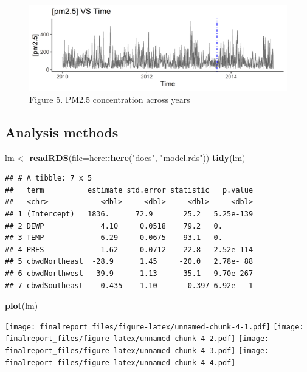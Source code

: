 \documentclass[]{article}
\newenvironment{Shaded}{\begin{snugshade}}{\end{snugshade}}
\newcommand{\DataTypeTok}[1]{\textcolor[rgb]{0.13,0.29,0.53}{#1}}
\newcommand{\KeywordTok}[1]{\textcolor[rgb]{0.13,0.29,0.53}{\textbf{#1}}}
\newcommand{\NormalTok}[1]{#1}
\newcommand{\OperatorTok}[1]{\textcolor[rgb]{0.81,0.36,0.00}{\textbf{#1}}}
\newcommand{\StringTok}[1]{\textcolor[rgb]{0.31,0.60,0.02}{#1}}
\begin{document}
\begin{figure}
\centering
\includegraphics{../images/year_PM2.5.png}
\caption{Figure 5. PM2.5 concentration across years}
\end{figure}

\hypertarget{analysis-methods}{%
\subsection{Analysis methods}\label{analysis-methods}}

\begin{Shaded}
\begin{Highlighting}[]
\NormalTok{lm <-}\StringTok{ }\KeywordTok{readRDS}\NormalTok{(}\DataTypeTok{file=}\NormalTok{here}\OperatorTok{::}\KeywordTok{here}\NormalTok{(}\StringTok{"docs"}\NormalTok{, }\StringTok{"model.rds"}\NormalTok{))}
\KeywordTok{tidy}\NormalTok{(lm)}
\end{Highlighting}
\end{Shaded}

\begin{verbatim}
## # A tibble: 7 x 5
##   term          estimate std.error statistic   p.value
##   <chr>            <dbl>     <dbl>     <dbl>     <dbl>
## 1 (Intercept)   1836.      72.9       25.2   5.25e-139
## 2 DEWP             4.10     0.0518    79.2   0.       
## 3 TEMP            -6.29     0.0675   -93.1   0.       
## 4 PRES            -1.62     0.0712   -22.8   2.52e-114
## 5 cbwdNortheast  -28.9      1.45     -20.0   2.78e- 88
## 6 cbwdNorthwest  -39.9      1.13     -35.1   9.70e-267
## 7 cbwdSoutheast    0.435    1.10       0.397 6.92e-  1
\end{verbatim}

\begin{Shaded}
\begin{Highlighting}[]
\KeywordTok{plot}\NormalTok{(lm)}
\end{Highlighting}
\end{Shaded}

\texttt{[image: finalreport\_files/figure-latex/unnamed-chunk-4-1.pdf]}
\texttt{[image: finalreport\_files/figure-latex/unnamed-chunk-4-2.pdf]}
\texttt{[image: finalreport\_files/figure-latex/unnamed-chunk-4-3.pdf]}
\texttt{[image: finalreport\_files/figure-latex/unnamed-chunk-4-4.pdf]}
\end{document}
